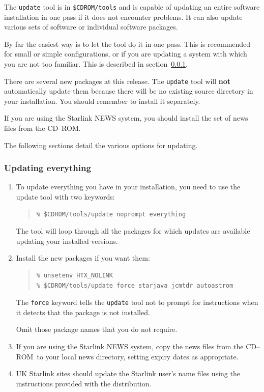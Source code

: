 \documentclass[twoside,11pt]{article}
\renewcommand{\_}{\texttt{\symbol{95}}}
\newcommand{\cdrom}{CD--ROM}
\newcommand{\cdrom}{CD-ROM}
\begin{document}
The \texttt{update} tool is in \texttt{\$CDROM/tools} and is capable
of updating an entire software installation in one pass if it does not
encounter problems.  It can also update various sets of software or
individual software packages.

By far the easiest way is to let the tool do it in one pass.  This is
recommended for small or simple configurations, or if you are updating
a system with which you are not too familiar.  This is described in
section~\ref{updating_everything}.

There are several new packages at this release.  The \texttt{update}
tool will \textbf{not} automatically update them because there will
be no existing source directory in your installation.  You
should remember to install it separately.

If you are using the Starlink NEWS system, you should install the set of
news files from the \cdrom.

The following sections detail the various options for updating.

\subsubsection{Updating everything}
\label{updating_everything}

\begin{enumerate}

\item To update everything you have in your installation, you need to use the
update tool with two keywords:

\begin{quote}
\begin{verbatim}
% $CDROM/tools/update noprompt everything
\end{verbatim}
\end{quote}

The tool will loop through all the packages for which updates are
available updating your installed versions.

\item Install the new packages if you want them:

\begin{quote}
\begin{verbatim}
% unsetenv HTX_NOLINK
% $CDROM/tools/update force starjava jcmtdr autoastrom
\end{verbatim}
\end{quote}

The \texttt{force} keyword tells the \texttt{update} tool not to prompt
for instructions when it detects that the package is not installed.

Omit those package names that you do not require.

\item If you are using the Starlink NEWS system, copy the news files from the
\cdrom\ to your local news directory, setting expiry dates as appropriate.

\item UK Starlink sites should update the Starlink user's name files using
the instructions provided with the distribution.

\end{enumerate}
\end{document}
